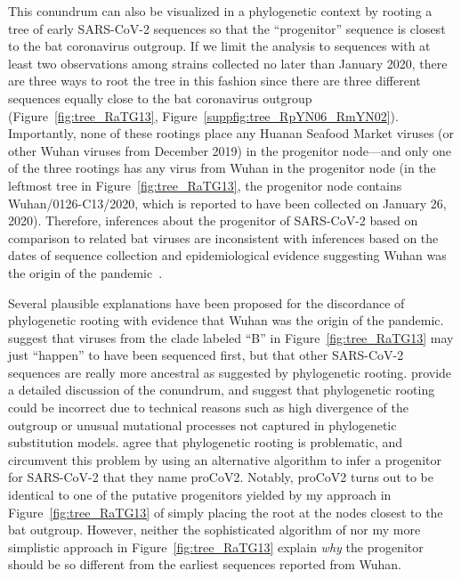 \documentclass[9pt,twocolumn,twoside]{gsajnl_modified}
\begin{document}
This conundrum can also be visualized in a phylogenetic context by rooting a tree of early SARS-CoV-2 sequences so that the ``progenitor'' sequence is closest to the bat coronavirus outgroup.
If we limit the analysis to sequences with at least two observations among strains collected no later than January 2020, there are three ways to root the tree in this fashion since there are three different sequences equally close to the bat coronavirus outgroup (Figure~\ref{fig:tree_RaTG13}, Figure~\ref{suppfig:tree_RpYN06_RmYN02}).
Importantly, none of these rootings place any Huanan Seafood Market viruses (or other Wuhan viruses from December 2019) in the progenitor node---and only one of the three rootings has any virus from Wuhan in the progenitor node (in the leftmost tree in Figure~\ref{fig:tree_RaTG13}, the progenitor node contains Wuhan/0126-C13/2020, which is reported to have been collected on January 26, 2020).
Therefore, inferences about the progenitor of SARS-CoV-2 based on comparison to related bat viruses are inconsistent with inferences based on the dates of sequence collection and epidemiological evidence suggesting Wuhan was the origin of the pandemic~\citep{pipes2021assessing}.

Several plausible explanations have been proposed for the discordance of phylogenetic rooting with evidence that Wuhan was the origin of the pandemic.
\citet{rambaut2020dynamic} suggest that viruses from the clade labeled ``B'' in Figure~\ref{fig:tree_RaTG13} may just ``happen'' to have been sequenced first, but that other SARS-CoV-2 sequences are really more ancestral as suggested by phylogenetic rooting.
\citet{pipes2021assessing} provide a detailed discussion of the conundrum, and suggest that phylogenetic rooting could be incorrect due to technical reasons such as high divergence of the outgroup or unusual mutational processes not captured in phylogenetic substitution models.
\citet{kumar2021evolutionary} agree that phylogenetic rooting is problematic, and circumvent this problem by using an alternative algorithm to infer a progenitor for SARS-CoV-2 that they name proCoV2.
Notably, proCoV2 turns out to be identical to one of the putative progenitors yielded by my approach in Figure~\ref{fig:tree_RaTG13} of simply placing the root at the nodes closest to the bat outgroup.
However, neither the sophisticated algorithm of \citet{kumar2021evolutionary} nor my more simplistic approach in Figure~\ref{fig:tree_RaTG13} explain \emph{why} the progenitor should be so different from the earliest sequences reported from Wuhan.
\end{document}
